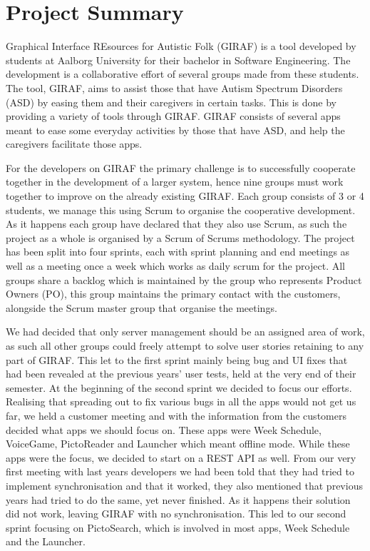 \section{Project Summary}
Graphical Interface REsources for Autistic Folk (GIRAF) is a tool developed by students at Aalborg University for their bachelor in Software Engineering.
The development is a collaborative effort of several groups made from these students.
The tool, GIRAF, aims to assist those that have Autism Spectrum Disorders (ASD) by easing them and their caregivers in certain tasks.
This is done by providing a variety of tools through GIRAF.
GIRAF consists of several apps meant to ease some everyday activities by those that have ASD, and help the caregivers facilitate those apps.

For the developers on GIRAF the primary challenge is to successfully cooperate together in the development of a larger system, hence nine groups must work together to improve on the already existing GIRAF.
Each group consists of 3 or 4 students, we manage this using Scrum to organise the cooperative development.
As it happens each group have declared that they also use Scrum, as such the project as a whole is organised by a Scrum of Scrums methodology.
The project has been split into four sprints, each with sprint planning and end meetings as well as a meeting once a week which works as daily scrum for the project.
All groups share a backlog which is maintained by the group who represents Product Owners (PO), this group maintains the primary contact with the customers, alongside the Scrum master group that organise the meetings.

\bigskip \noindent
We had decided that only server management should be an assigned area of work, as such all other groups could freely attempt to solve user stories retaining to any part of GIRAF.
This let to the first sprint mainly being bug and UI fixes that had been revealed at the previous years' user tests, held at the very end of their semester.
At the beginning of the second sprint we decided to focus our efforts.
Realising that spreading out to fix various bugs in all the apps would not get us far, we held a customer meeting and with the information from the customers decided what apps we should focus on.
These apps were Week Schedule, VoiceGame, PictoReader and Launcher which meant offline mode.
While these apps were the focus, we decided to start on a REST API as well.
From our very first meeting with last years developers we had been told that they had tried to implement synchronisation and that it worked, they also mentioned that previous years had tried to do the same, yet never finished.
As it happens their solution did not work, leaving GIRAF with no synchronisation.
This led to our second sprint focusing on PictoSearch, which is involved in most apps, Week Schedule and the Launcher.


